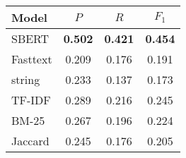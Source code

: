 \begin{tabular}{lccc}
    \toprule
    Model & \textbf{$P$} & \textbf{$R$} & \textbf{$F_1$} \\
    \midrule
    SBERT   & \textbf{0.502} & \textbf{0.421} & \textbf{0.454} \\
    Fasttext & 0.209 & 0.176 & 0.191 \\
    string & 0.233 & 0.137 & 0.173 \\
    TF-IDF   & 0.289 & 0.216 & 0.245 \\
    BM-25    & 0.267 & 0.196 & 0.224 \\
    Jaccard & 0.245 & 0.176 & 0.205 \\
    \bottomrule
\end{tabular}%
\label{tab:lovdata-avg}